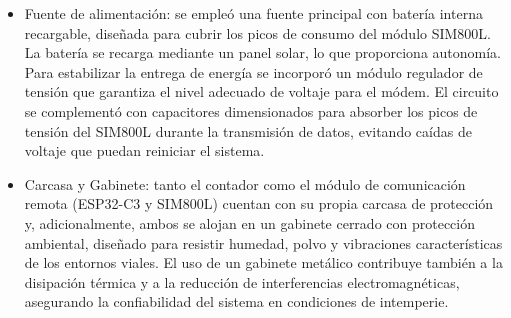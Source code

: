 \begin{itemize}
\item Fuente de alimentación: se empleó una fuente principal con batería interna recargable, diseñada para cubrir los picos de consumo del módulo SIM800L. La batería se recarga mediante un panel solar, lo que proporciona autonomía. Para estabilizar la entrega de energía se incorporó un módulo regulador de tensión que garantiza el nivel adecuado de voltaje para el módem. El circuito se complementó con capacitores dimensionados para absorber los picos de tensión del SIM800L durante la transmisión de datos, evitando caídas de voltaje que puedan reiniciar el sistema.

\item Carcasa y Gabinete: tanto el contador como el módulo de comunicación remota (ESP32-C3 y SIM800L) cuentan con su propia carcasa de protección y, adicionalmente, ambos se alojan en un gabinete cerrado con protección ambiental, diseñado para resistir humedad, polvo y vibraciones características de los entornos viales. El uso de un gabinete metálico contribuye también a la disipación térmica y a la reducción de interferencias electromagnéticas, asegurando la confiabilidad del sistema en condiciones de intemperie. 

\end{itemize}


